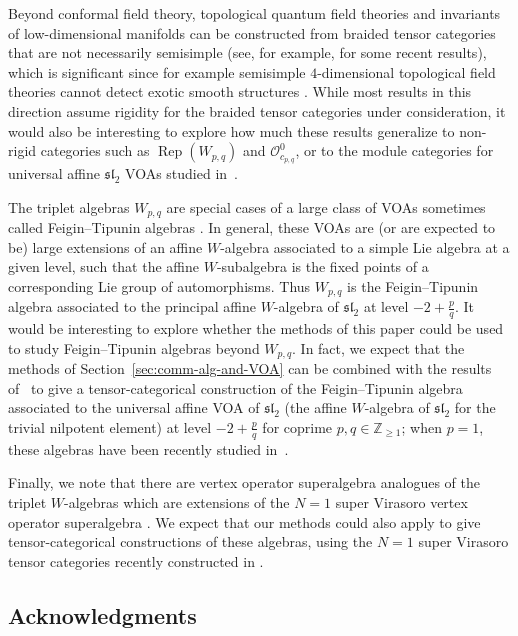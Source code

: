 \documentclass[pdftex]{sigma}
\numberwithin{equation}{section}
\theoremstyle{definition}
\begin{document}
Beyond conformal field theory, topological quantum field theories and invariants of low-dimensional manifolds can be constructed from braided tensor categories that are not necessarily semisimple (see, for example, \cite{BGR,Bla-De-Renzi, CCC, DR-G-G-PM-R} for some recent results), which is significant since for example
semisimple $4$-dimensional topological field theories cannot detect exotic smooth structures \cite{Reutter}. While most results in this direction assume rigidity for the braided tensor categories under consideration, it would also be interesting to explore how much these results generalize to non-rigid categories such as $\operatorname{Rep}(W_{p,q})$ and $\mathcal{O}_{c_{p,q}}^0$, or to the module categories for universal affine $\mathfrak{sl}_2$ VOAs studied in~\cite{MY-univ-sl2}.

The triplet algebras $W_{p,q}$ are special cases of a large class of VOAs sometimes called Feigin--Tipunin algebras \cite{FT, Sugimoto}. In general, these VOAs are (or are expected to be) large extensions of an affine $W$-algebra associated to a simple Lie algebra at a given level, such that the affine $W$-subalgebra is the fixed points of a corresponding Lie group of automorphisms. Thus $W_{p,q}$ is the Feigin--Tipunin algebra associated to the principal affine $W$-algebra of $\mathfrak{sl}_2$ at level $-2+\frac{p}{q}$. It would be interesting to explore whether the methods of this paper could be used to study Feigin--Tipunin algebras beyond $W_{p,q}$. In fact, we expect that the methods of Section~\ref{sec:comm-alg-and-VOA} can be combined with the results of~\cite{MY-univ-sl2} to give a tensor-categorical construction of the Feigin--Tipunin algebra associated to the universal affine VOA of $\mathfrak{sl}_2$ (the affine $W$-algebra of $\mathfrak{sl}_2$ for the trivial nilpotent element) at level $-2+\frac{p}{q}$ for coprime $p,q\in\mathbb{Z}_{\geq 1}$; when $p=1$, these algebras have been recently studied in~\cite{CNS}.

Finally, we note that there are vertex operator superalgebra analogues of the triplet $W$-algebras which are extensions of the $N=1$ super Virasoro vertex operator superalgebra \cite{AM-N=1-triplet}. We expect that our methods could also apply to give tensor-categorical constructions of these algebras, using the $N=1$ super Virasoro tensor categories recently constructed in \cite{CMOY}.

\subsection*{Acknowledgments}
\end{document}
